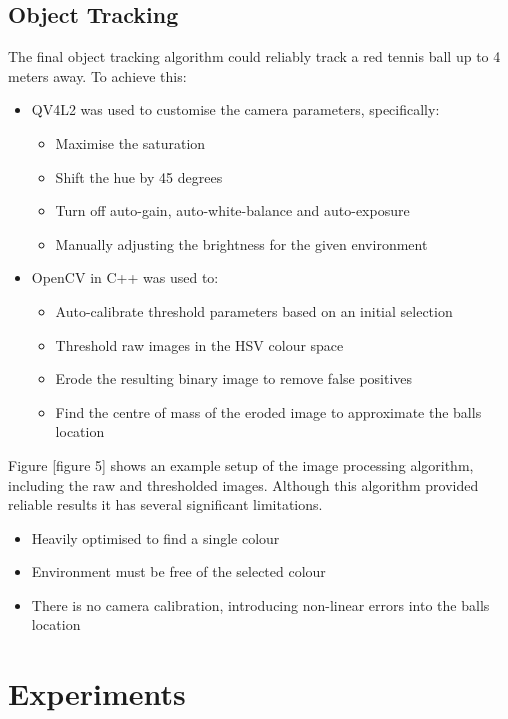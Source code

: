 \documentclass[conference]{IEEEtran}
\begin{document}
\subsection{Object Tracking}
The final object tracking algorithm could reliably track a red tennis ball up to 4 meters away. To achieve this:
\begin{itemize}
\item QV4L2 was used to customise the camera parameters, specifically:
\begin{itemize}
	\item Maximise the saturation
	\item Shift the hue by 45 degrees

	\item Turn off auto-gain, auto-white-balance and auto-exposure

	\item Manually adjusting the brightness for the given environment
\end{itemize}

\item OpenCV in C++ was used to:
\begin{itemize}
	\item Auto-calibrate threshold parameters based on an initial selection 

	\item Threshold raw images in the HSV colour space

	\item Erode the resulting binary image to remove false positives

	\item Find the centre of mass of the eroded image to approximate the balls location
\end{itemize}
\end{itemize}
Figure [figure 5] shows an example setup of the image processing algorithm, including the raw and thresholded images. Although this algorithm provided reliable results it has several significant limitations.
\begin{itemize}
	\item Heavily optimised to find a single colour

	\item Environment must be free of the selected colour

	\item There is no camera calibration, introducing non-linear errors into the balls location
\end{itemize}
\section{Experiments}
\end{document}
